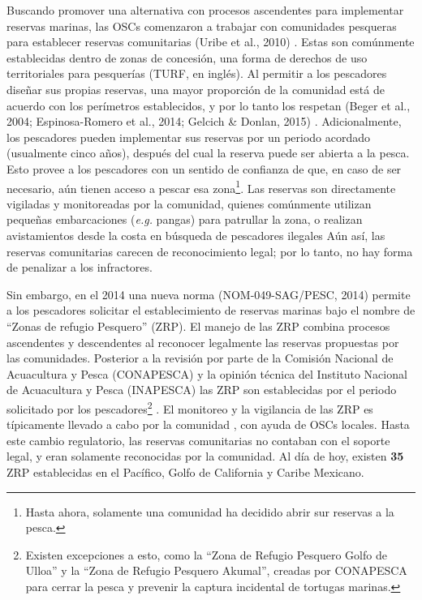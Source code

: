 \documentclass[12pt,]{article}
\let\rmarkdownfootnote\footnote%
\def\footnote{\protect\rmarkdownfootnote}
\begin{document}
Buscando promover una alternativa con procesos ascendentes para
implementar reservas marinas, las OSCs comenzaron a trabajar con
comunidades pesqueras para establecer reservas comunitarias (Uribe et
al., 2010) . Estas son comúnmente establecidas dentro de zonas de
concesión, una forma de derechos de uso territoriales para pesquerías
(TURF, en inglés). Al permitir a los pescadores diseñar sus propias
reservas, una mayor proporción de la comunidad está de acuerdo con los
perímetros establecidos, y por lo tanto los respetan (Beger et al.,
2004; Espinosa-Romero et al., 2014; Gelcich \& Donlan, 2015) .
Adicionalmente, los pescadores pueden implementar sus reservas por un
periodo acordado (usualmente cinco años), después del cual la reserva
puede ser abierta a la pesca. Esto provee a los pescadores con un
sentido de confianza de que, en caso de ser necesario, aún tienen acceso
a pescar esa zona\footnote{Hasta ahora, solamente una comunidad ha
  decidido abrir sur reservas a la pesca.}. Las reservas son
directamente vigiladas y monitoreadas por la comunidad, quienes
comúnmente utilizan pequeñas embarcaciones (\emph{e.g.} pangas) para
patrullar la zona, o realizan avistamientos desde la costa en búsqueda
de pescadores ilegales Aún así, las reservas comunitarias carecen de
reconocimiento legal; por lo tanto, no hay forma de penalizar a los
infractores.

Sin embargo, en el 2014 una nueva norma (NOM-049-SAG/PESC, 2014) permite
a los pescadores solicitar el establecimiento de reservas marinas bajo
el nombre de ``Zonas de refugio Pesquero'' (ZRP). El manejo de las ZRP
combina procesos ascendentes y descendentes al reconocer legalmente las
reservas propuestas por las comunidades. Posterior a la revisión por
parte de la Comisión Nacional de Acuacultura y Pesca (CONAPESCA) y la
opinión técnica del Instituto Nacional de Acuacultura y Pesca (INAPESCA)
las ZRP son establecidas por el periodo solicitado por los
pescadores\footnote{Existen excepciones a esto, como la ``Zona de
  Refugio Pesquero Golfo de Ulloa'' y la ``Zona de Refugio Pesquero
  Akumal'', creadas por CONAPESCA para cerrar la pesca y prevenir la
  captura incidental de tortugas marinas.} . El monitoreo y la
vigilancia de las ZRP es típicamente llevado a cabo por la comunidad ,
con ayuda de OSCs locales. Hasta este cambio regulatorio, las reservas
comunitarias no contaban con el soporte legal, y eran solamente
reconocidas por la comunidad. Al día de hoy, existen \textbf{35} ZRP
establecidas en el Pacífico, Golfo de California y Caribe Mexicano.
\end{document}

